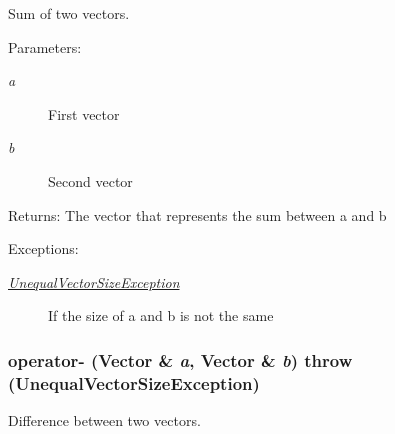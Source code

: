 Sum of two vectors. 

\begin{Desc}
\item[Parameters:]
\begin{description}
\item[{\em a}]First vector \item[{\em b}]Second vector \end{description}
\end{Desc}
\begin{Desc}
\item[Returns:]The vector that represents the sum between a and b \end{Desc}
\begin{Desc}
\item[Exceptions:]
\begin{description}
\item[{\em \hyperlink{classgrassmann_1_1UnequalVectorSizeException}{UnequalVectorSizeException}}]If the size of a and b is not the same \end{description}
\end{Desc}
\hypertarget{classgrassmann_1_1Vector_ac3997b0f5002019c4373e8f9005f85b}{
\subsubsection[operator-]{ operator- ({\bf Vector} \& {\em a}, \/  {\bf Vector} \& {\em b})  throw ({\bf UnequalVectorSizeException})}}
\label{classgrassmann_1_1Vector_ac3997b0f5002019c4373e8f9005f85b}


Difference between two vectors. 

